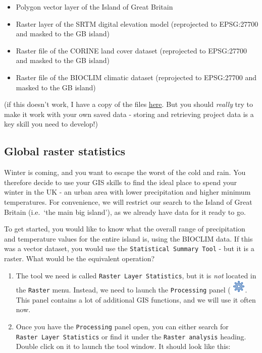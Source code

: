 \documentclass[
  letterpaper,
  DIV=11,
  numbers=noendperiod]{scrreprt}
\providecommand{\tightlist}{%
  \setlength{\itemsep}{0pt}\setlength{\parskip}{0pt}}\usepackage{longtable,booktabs,array}
\begin{document}
\begin{itemize}
\tightlist
\item
  Polygon vector layer of the Island of Great Britain
\item
  Raster layer of the SRTM digital elevation model (reprojected to
  EPSG:27700 and masked to the GB island)
\item
  Raster file of the CORINE land cover dataset (reprojected to
  EPSG:27700 and masked to the GB island)
\item
  Raster file of the BIOCLIM climatic dataset (reprojected to EPSG:27700
  and masked to the GB island)
\end{itemize}

(if this doesn't work, I have a copy of the files
\href{https://stir-my.sharepoint.com/:u:/g/personal/ala2_stir_ac_uk/Eb28YoDGBM9MlraOgrbiehcBv9Q8BulLcloDNVypXmCUBw?e=DZfrqZ}{here}.
But you should \emph{really} try to make it work with your own saved
data - storing and retrieving project data is a key skill you need to
develop!)

\subsection{Global raster statistics}\label{global-raster-statistics}

Winter is coming, and you want to escape the worst of the cold and rain.
You therefore decide to use your GIS skills to find the ideal place to
spend your winter in the UK - an urban area with lower precipitation and
higher minimum temperatures. For convenience, we will restrict our
search to the Island of Great Britain (i.e.~`the main big island'), as
we already have data for it ready to go.

To get started, you would like to know what the overall range of
precipitation and temperature values for the entire island is, using the
BIOCLIM data. If this was a vector dataset, you would use the
\texttt{Statistical\ Summary\ Tool} - but it is a raster. What would be
the equivalent operation?

\begin{enumerate}
\def\labelenumi{(\arabic{enumi})}
\setcounter{enumi}{160}
\item
  The tool we need is called \texttt{Raster\ Layer\ Statistics}, but it
  is \emph{not} located in the \texttt{Raster} menu. Instead, we need to
  launch the \texttt{Processing} panel (
  \includegraphics{index_files/mediabag/processingAlgorithm.png}. This
  panel contains a lot of additional GIS functions, and we will use it
  often now.
\item
  Once you have the \texttt{Processing} panel open, you can either
  search for \texttt{Raster\ Layer\ Statistics} or find it under the
  \texttt{Raster\ analysis} heading. Double click on it to launch the
  tool window. It should look like this:
\end{enumerate}
\end{document}

